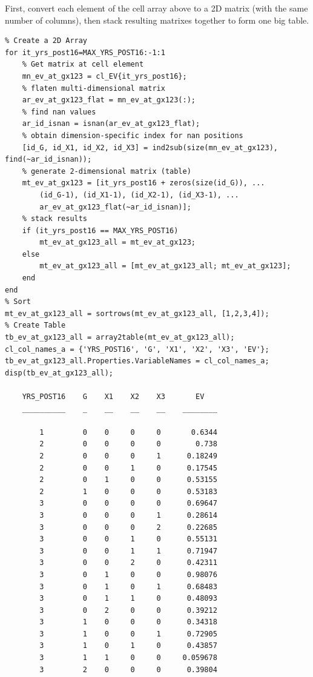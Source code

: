 \documentclass[
]{book}
\begin{document}
First, convert each element of the cell array above to a 2D matrix (with
the same number of columns), then stack resulting matrixes together to
form one big table.

\begin{verbatim}
% Create a 2D Array
for it_yrs_post16=MAX_YRS_POST16:-1:1
    % Get matrix at cell element
    mn_ev_at_gx123 = cl_EV{it_yrs_post16};
    % flaten multi-dimensional matrix
    ar_ev_at_gx123_flat = mn_ev_at_gx123(:);
    % find nan values
    ar_id_isnan = isnan(ar_ev_at_gx123_flat);
    % obtain dimension-specific index for nan positions
    [id_G, id_X1, id_X2, id_X3] = ind2sub(size(mn_ev_at_gx123), find(~ar_id_isnan));
    % generate 2-dimensional matrix (table)
    mt_ev_at_gx123 = [it_yrs_post16 + zeros(size(id_G)), ...
        (id_G-1), (id_X1-1), (id_X2-1), (id_X3-1), ...
        ar_ev_at_gx123_flat(~ar_id_isnan)];
    % stack results
    if (it_yrs_post16 == MAX_YRS_POST16)
        mt_ev_at_gx123_all = mt_ev_at_gx123;
    else
        mt_ev_at_gx123_all = [mt_ev_at_gx123_all; mt_ev_at_gx123];
    end
end
% Sort
mt_ev_at_gx123_all = sortrows(mt_ev_at_gx123_all, [1,2,3,4]);
% Create Table
tb_ev_at_gx123_all = array2table(mt_ev_at_gx123_all);
cl_col_names_a = {'YRS_POST16', 'G', 'X1', 'X2', 'X3', 'EV'};
tb_ev_at_gx123_all.Properties.VariableNames = cl_col_names_a;
disp(tb_ev_at_gx123_all);

    YRS_POST16    G    X1    X2    X3       EV   
    __________    _    __    __    __    ________

        1         0    0     0     0       0.6344
        2         0    0     0     0        0.738
        2         0    0     0     1      0.18249
        2         0    0     1     0      0.17545
        2         0    1     0     0      0.53155
        2         1    0     0     0      0.53183
        3         0    0     0     0      0.69647
        3         0    0     0     1      0.28614
        3         0    0     0     2      0.22685
        3         0    0     1     0      0.55131
        3         0    0     1     1      0.71947
        3         0    0     2     0      0.42311
        3         0    1     0     0      0.98076
        3         0    1     0     1      0.68483
        3         0    1     1     0      0.48093
        3         0    2     0     0      0.39212
        3         1    0     0     0      0.34318
        3         1    0     0     1      0.72905
        3         1    0     1     0      0.43857
        3         1    1     0     0     0.059678
        3         2    0     0     0      0.39804
\end{verbatim}
\end{document}
